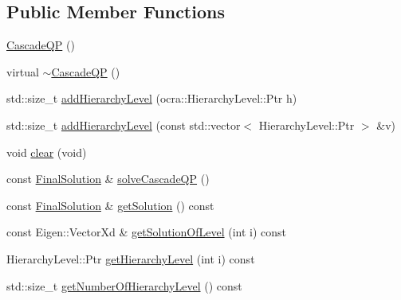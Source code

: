 \subsection*{Public Member Functions}
\begin{DoxyCompactItemize}
\item 
\hyperlink{classocra_1_1CascadeQP_a545a3098762becf8a663eb8ab3bd4899}{Cascade\+QP} ()
\item 
virtual \hyperlink{classocra_1_1CascadeQP_a843673d4951f7a8e972598d0f361ad8d}{$\sim$\+Cascade\+QP} ()
\item 
std\+::size\+\_\+t \hyperlink{classocra_1_1CascadeQP_ab1ac4edfcf8e8c7567fc0a5ca5bd5f86}{add\+Hierarchy\+Level} (ocra\+::\+Hierarchy\+Level\+::\+Ptr h)
\item 
std\+::size\+\_\+t \hyperlink{classocra_1_1CascadeQP_a6415299f7159a36a75940e073f64b770}{add\+Hierarchy\+Level} (const std\+::vector$<$ Hierarchy\+Level\+::\+Ptr $>$ \&v)
\item 
void \hyperlink{classocra_1_1CascadeQP_a476d6af7b355fd8a3887e9708253cd1a}{clear} (void)
\item 
const \hyperlink{structocra_1_1FinalSolution}{Final\+Solution} \& \hyperlink{classocra_1_1CascadeQP_a11e01b608414badd9af6794076eb8b33}{solve\+Cascade\+QP} ()
\item 
const \hyperlink{structocra_1_1FinalSolution}{Final\+Solution} \& \hyperlink{classocra_1_1CascadeQP_af78234e97b3e438f6fe0ee4a2cb78d00}{get\+Solution} () const 
\item 
const Eigen\+::\+Vector\+Xd \& \hyperlink{classocra_1_1CascadeQP_aaef067f68698171ac623b4fe93c33cd6}{get\+Solution\+Of\+Level} (int i) const 
\item 
Hierarchy\+Level\+::\+Ptr \hyperlink{classocra_1_1CascadeQP_ae7ab756cbbd178b424f17a5a4e4554b4}{get\+Hierarchy\+Level} (int i) const 
\item 
std\+::size\+\_\+t \hyperlink{classocra_1_1CascadeQP_aa5c57db300cf80b158a089ca6bbac976}{get\+Number\+Of\+Hierarchy\+Level} () const 
\end{DoxyCompactItemize}
